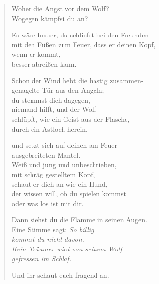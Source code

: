 
\cleartoverso


\begin{verse}

Woher die Angst vor dem Wolf?\\
Wogegen kämpfst du an?

Es wäre besser, du schliefst bei den Freunden\\
mit den Füßen zum Feuer, dass er deinen Kopf,\\
wenn er kommt,\\
besser abreißen kann.

Schon der Wind hebt die hastig zusammen-\\
genagelte Tür aus den Angeln;\\
du stemmst dich dagegen,\\
niemand hilft, und der Wolf\\
schlüpft, wie ein Geist aus der Flasche,\\
durch ein Astloch herein,

und setzt sich auf deinen am Feuer\\
ausgebreiteten Mantel.\\
Weiß und jung und unbeschrieben,\\
mit schräg gestelltem Kopf,\\
schaut er dich an wie ein Hund,\\
der wissen will, ob du spielen kommst,\\
oder was los ist mit dir.

Dann siehst du die Flamme in seinen Augen.\\
Eine Stimme sagt: {\itshape So billig\\
kommst du nicht davon.\\
Kein Träumer wird von seinem Wolf\\
gefressen im Schlaf.}

Und ihr schaut euch fragend an.

\end{verse}

\clearpage


